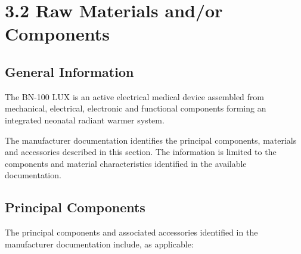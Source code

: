 ﻿

\section*{3.2 Raw Materials and/or Components}



\subsection*{General Information}

The BN-100 LUX is an active electrical medical device assembled
from mechanical, electrical, electronic and functional components
forming an integrated neonatal radiant warmer system.

The manufacturer documentation identifies the principal components,
materials and accessories described in this section. The information
is limited to the components and material characteristics identified
in the available documentation.


\subsection*{Principal Components}

The principal components and associated accessories identified in
the manufacturer documentation include, as applicable:

